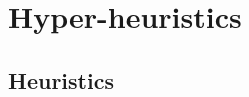 \documentclass{beamer}
\begin{document}
\begin{frame}
\end{frame}

\section[Hyper-heuristics]{Hyper-heuristics}
\subsection{Heuristics}
\end{document}
